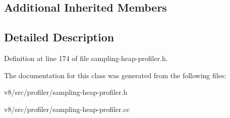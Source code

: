 \subsection*{Additional Inherited Members}


\subsection{Detailed Description}


Definition at line 174 of file sampling-\/heap-\/profiler.\+h.



The documentation for this class was generated from the following files\+:\begin{DoxyCompactItemize}
\item 
v8/src/profiler/sampling-\/heap-\/profiler.\+h\item 
v8/src/profiler/sampling-\/heap-\/profiler.\+cc\end{DoxyCompactItemize}
